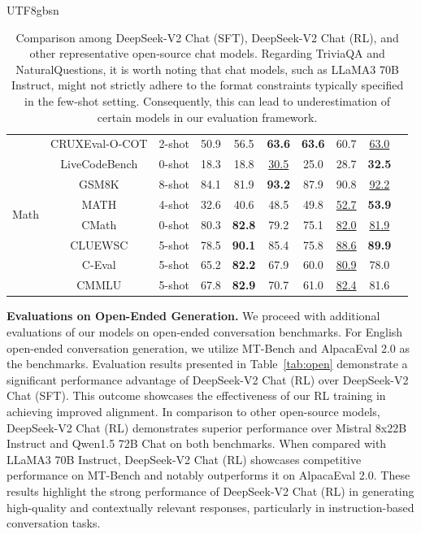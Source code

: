 \documentclass[11pt, a4paper, logo, copyright, nonumbering]{deepseek}
\newcommand{\dsviisft}{DeepSeek-V2 Chat (SFT)}
\newcommand{\dsviirl}{DeepSeek-V2 Chat (RL)}
\begin{document}
\begin{CJK*}{UTF8}{gbsn}
\begin{table}[!t]
\begin{tabular}{@{}c c l c | cc c |c c c@{}}
    & CRUXEval-O-COT & 2-shot & 50.9 & 56.5 & \textbf{63.6} & \textbf{63.6} & 60.7 & \underline{63.0}\\
    & LiveCodeBench & 0-shot & 18.3 & 18.8 & \underline{30.5} &25.0 & 28.7 &\textbf{32.5}\\
    \midrule
    \multirow{4}{*}{Math} & GSM8K & 8-shot & 84.1 & 81.9 & \textbf{93.2} & 87.9 & 90.8 & \underline{92.2} \\
    & MATH & 4-shot & 32.6 & 40.6 & 48.5 & 49.8 & \underline{52.7}& \textbf{53.9}  \\
    & CMath & 0-shot & 80.3 & \textbf{82.8} & 79.2 & 75.1 & \underline{82.0} & \underline{81.9} \\
    \midrule
    \multirow{3}{*}{Chinese} & CLUEWSC & 5-shot & 78.5 & \textbf{90.1} & 85.4 & 75.8 & \underline{88.6} & \textbf{89.9} \\
    & C-Eval & 5-shot & 65.2 & \textbf{82.2} & 67.9 & 60.0 & \underline{80.9} & 78.0 \\
    & CMMLU & 5-shot & 67.8 & \textbf{82.9} & 70.7 & 61.0 & \underline{82.4} & 81.6 \\
    \bottomrule
    \end{tabular}
    \caption{
    Comparison among \dsviisft{}, \dsviirl{}, and other representative open-source chat models. 
    Regarding TriviaQA and NaturalQuestions, it is worth noting that chat models, such as LLaMA3 70B Instruct, might not strictly adhere to the format constraints typically specified in the few-shot setting. 
    Consequently, this can lead to underestimation of certain models in our evaluation framework.
    }
    \label{tab:sft}
\end{table}

\textbf{Evaluations on Open-Ended Generation.} 
We proceed with additional evaluations of our models on open-ended conversation benchmarks. 
For English open-ended conversation generation, we utilize MT-Bench and AlpacaEval 2.0 as the benchmarks. 
Evaluation results presented in Table~\ref{tab:open} demonstrate a significant performance advantage of \dsviirl{} over \dsviisft{}. 
This outcome showcases the effectiveness of our RL training in achieving improved alignment. 
In comparison to other open-source models, \dsviirl{} demonstrates superior performance over Mistral 8x22B Instruct and Qwen1.5 72B Chat on both benchmarks. 
When compared with LLaMA3 70B Instruct, \dsviirl{} showcases competitive performance on MT-Bench and notably outperforms it on AlpacaEval 2.0. 
These results highlight the strong performance of \dsviirl{} in generating high-quality and contextually relevant responses, particularly in instruction-based conversation tasks.


\end{CJK*}
\end{document}
